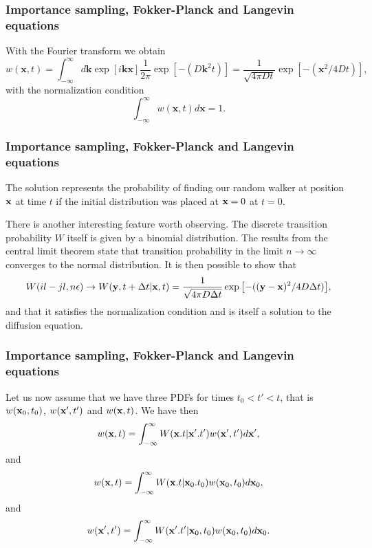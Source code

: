 \documentclass{beamer}
\begin{document}
\begin{frame}
\frametitle{Importance sampling, Fokker-Planck and Langevin equations}

\begin{block}{}
With the Fourier transform we obtain 
\[
   w(\mathbf{x},t)=\int_{-\infty}^{\infty}d\mathbf{k} \exp{\left[i\mathbf{kx}\right]}\frac{1}{2\pi}\exp{\left[-(D\mathbf{k}^2t)\right]}=
    \frac{1}{\sqrt{4\pi Dt}}\exp{\left[-(\mathbf{x}^2/4Dt)\right]}, 
\]
with the normalization condition
\[
   \int_{-\infty}^{\infty}w(\mathbf{x},t)d\mathbf{x}=1.
\]

\end{block}
\end{frame}

\begin{frame}
\frametitle{Importance sampling, Fokker-Planck and Langevin equations}

\begin{block}{}
The solution represents the probability of finding
our random walker at position ${\bf x}$ at time $t$ if the initial distribution 
was placed at ${\bf x}=0$ at $t=0$. 

There is another interesting feature worth observing. The discrete transition probability $W$
itself is given by a binomial distribution.
The results from the central limit theorem state that 
transition probability in the limit $n\rightarrow \infty$ converges to the normal 
distribution. It is then possible to show that
\[
    W(il-jl,n\epsilon)\rightarrow W({\bf y},t+\Delta t|{\bf x},t)=
    \frac{1}{\sqrt{4\pi D\Delta t}}\exp{\left[-(({\bf y}-{\bf x})^2/4D\Delta t)\right]},
\]
and that it satisfies the normalization condition and is itself a solution
to the diffusion equation.


\end{block}
\end{frame}

\begin{frame}
\frametitle{Importance sampling, Fokker-Planck and Langevin equations}

\begin{block}{}
Let us now assume that we have three PDFs for times $t_0 < t' < t$, that is
$w({\bf x}_0,t_0)$, $w({\bf x}',t')$ and $w({\bf x},t)$.
We have then  
\[
   w({\bf x},t)= \int_{-\infty}^{\infty} W({\bf x}.t|{\bf x}'.t')w({\bf x}',t')d{\bf x}',
\]
and
\[
   w({\bf x},t)= \int_{-\infty}^{\infty} W({\bf x}.t|{\bf x}_0.t_0)w({\bf x}_0,t_0)d{\bf x}_0,
\]
and
\[
   w({\bf x}',t')= \int_{-\infty}^{\infty} W({\bf x}'.t'|{\bf x}_0,t_0)w({\bf x}_0,t_0)d{\bf x}_0.
\]


\end{block}
\end{frame}
\end{document}
